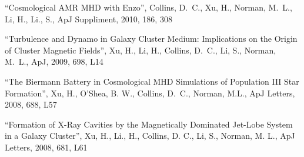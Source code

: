 \medskip
\noindent
``Cosmological AMR MHD with Enzo'', 
Collins, D.~C., Xu, H., Norman, M.~L., Li, H., Li., S.,
ApJ Suppliment, 2010, 186, 308

\medskip
\noindent
``Turbulence and Dynamo in Galaxy Cluster Medium: Implications on the Origin of Cluster Magnetic Fields'',
Xu, H., Li, H., Collins, D.~C., Li, S., Norman, M.~L.,
ApJ, 2009, 698, L14

\medskip
\noindent
``The Biermann Battery in Cosmological MHD Simulations of Population III Star Formation'',
Xu, H., O'Shea, B. W., Collins, D.~C., Norman, M.L.,
ApJ Letters, 2008, 688, L57  

\medskip
\noindent
``Formation of X-Ray Cavities by the Magnetically Dominated Jet-Lobe System in a Galaxy Cluster'',
Xu, H., Li., H., Collins, D. C., Li, S., Norman, M. L.,
ApJ Letters, 2008, 681, L61 
